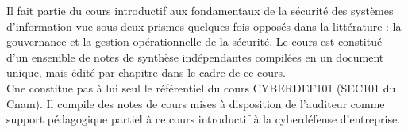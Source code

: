 

Il fait partie du cours introductif aux fondamentaux de la sécurité des systèmes d'information vue sous deux prismes quelques fois opposés dans la littérature : la gouvernance et la gestion opérationnelle de la sécurité.
Le cours est constitué d'un ensemble de notes de synthèse indépendantes compilées en un document unique, mais édité par chapitre dans le cadre de ce cours.\\
C\edoc ne constitue pas à lui seul le référentiel du cours CYBERDEF101 (SEC101 du Cnam). Il compile des notes de cours mises à disposition de l'auditeur comme support pédagogique partiel à ce cours introductif à la cyberdéfense d'entreprise.